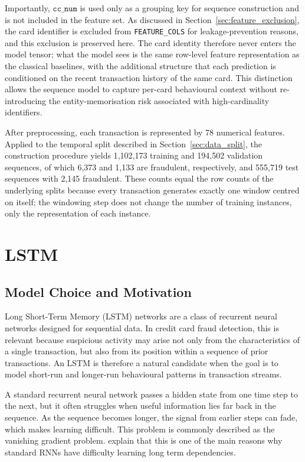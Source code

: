 \documentclass[oneside,12pt,parskip=half,american,numbers=noenddot]{scrreprt}
\begin{document}
Importantly, \(\texttt{cc\_num}\) is used only as a grouping key for sequence construction and is not included in the feature set. As discussed in Section~\ref{sec:feature_exclusion}, the card identifier is excluded from \texttt{FEATURE\_COLS} for leakage-prevention reasons, and this exclusion is preserved here. The card identity therefore never enters the model tensor; what the model sees is the same row-level feature representation as the classical baselines, with the additional structure that each prediction is conditioned on the recent transaction history of the same card. This distinction allows the sequence model to capture per-card behavioural context without re-introducing the entity-memorisation risk associated with high-cardinality identifiers.

After preprocessing, each transaction is represented by 78 numerical features. Applied to the temporal split described in Section~\ref{sec:data_split}, the construction procedure yields 1{,}102{,}173 training and 194{,}502 validation sequences, of which 6{,}373 and 1{,}133 are fraudulent, respectively, and 555{,}719 test sequences with 2{,}145 fraudulent. These counts equal the row counts of the underlying splits because every transaction generates exactly one window centred on itself; the windowing step does not change the number of training instances, only the representation of each instance.


\section{LSTM}
\label{sec:lstm}

\subsection{Model Choice and Motivation}
Long Short-Term Memory (LSTM) networks are a class of recurrent neural networks designed for sequential data. In credit card fraud detection, this is relevant because suspicious activity may arise not only from the characteristics of a single transaction, but also from its position within a sequence of prior transactions. An LSTM is therefore a natural candidate when the goal is to model short-run and longer-run behavioural patterns in transaction streams.

A standard recurrent neural network passes a hidden state from one time step to the next, but it often struggles when useful information lies far back in the sequence. As the sequence becomes longer, the signal from earlier steps can fade, which makes learning difficult. This problem is commonly described as the vanishing gradient problem. \textcite{olah_understanding_2015} explain that this is one of the main reasons why standard RNNs have difficulty learning long term dependencies.
\end{document}
